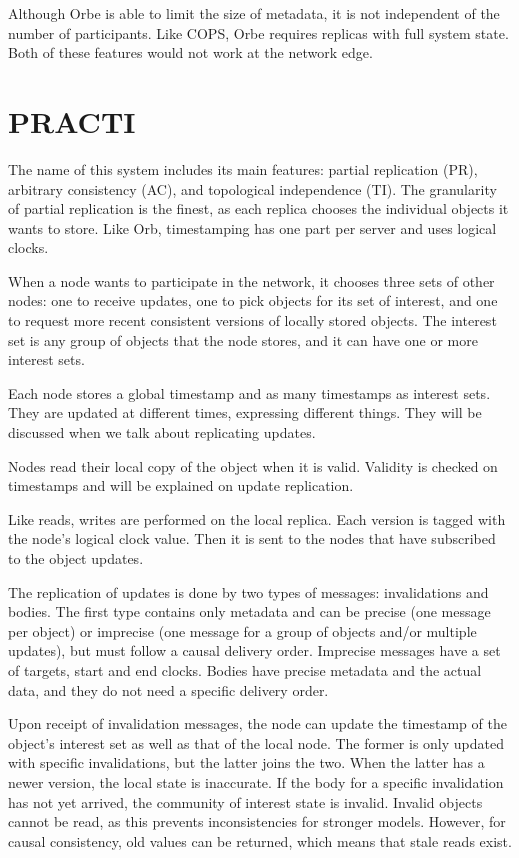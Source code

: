 Although Orbe is able to limit the size of metadata, 
it is not independent of the number of participants. 
Like COPS, Orbe requires replicas with full system state. 
Both of these features would not work at the network edge.

\section{PRACTI}
\label{sec:soa:practi}

The name of this system \cite{belaramani2006practi} includes its main features: partial replication (PR), arbitrary consistency (AC), and topological independence (TI). The granularity of partial replication is the finest, as each replica chooses the individual objects it wants to store. Like Orb, timestamping has one part per server and uses logical clocks. 

When a node wants to participate in the network, it chooses three sets of other nodes: one to receive updates, one to pick objects for its set of interest, and one to request more recent consistent versions of locally stored objects. The interest set is any group of objects that the node stores, and it can have one or more interest sets. 

Each node stores a global timestamp and as many timestamps as interest sets. They are updated at different times, expressing different things. They will be discussed when we talk about replicating updates. 

Nodes read their local copy of the object when it is valid. Validity is checked on timestamps and will be explained on update replication. 

Like reads, writes are performed on the local replica. Each version is tagged with the node's logical clock value. Then it is sent to the nodes that have subscribed to the object updates. 

The replication of updates is done by two types of messages: invalidations and bodies. The first type contains only metadata and can be precise (one message per object) or imprecise (one message for a group of objects and/or multiple updates), but must follow a causal delivery order. Imprecise messages have a set of targets, start and end clocks. Bodies have precise metadata and the actual data, and they do not need a specific delivery order. 

Upon receipt of invalidation messages, the node can update the timestamp of the object's interest set as well as that of the local node. The former is only updated with specific invalidations, but the latter joins the two. When the latter has a newer version, the local state is inaccurate. If the body for a specific invalidation has not yet arrived, the community of interest state is invalid. Invalid objects cannot be read, as this prevents inconsistencies for stronger models. However, for causal consistency, old values can be returned, which means that stale reads exist. 

